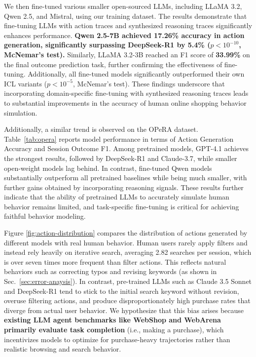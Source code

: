 \documentclass{article} %
\begin{document}
We then fine-tuned various smaller open-sourced LLMs, including LLaMA 3.2, Qwen 2.5, and Mistral, using our training dataset. The results demonstrate that fine-tuning LLMs with action traces and synthesized reasoning traces significantly enhances performance. \textbf{Qwen 2.5-7B achieved \textbf{17.26\%} accuracy in action generation, significantly surpassing DeepSeek-R1 by \textbf{5.4\%} {($p < 10^{-10}$, McNemar's test)}.} Similarly, LLaMA 3.2-3B reached an F1 score of \textbf{33.99\%} on the final outcome prediction task, further confirming the effectiveness of fine-tuning.
Additionally, all fine-tuned models significantly outperformed their own ICL variants ($p < 10^{-5}$, McNemar's test).
These findings underscore that incorporating domain-specific fine-tuning with synthesized reasoning traces leads to substantial improvements in the accuracy of human online shopping behavior simulation.

Additionally, a similar trend is observed on the OPeRA dataset. Table~\ref{tab:opera} reports model performance in terms of Action Generation Accuracy and Session Outcome F1. Among pretrained models, GPT-4.1 achieves the strongest results, followed by DeepSeek-R1 and Claude-3.7, while smaller open-weight models lag behind. In contrast, fine-tuned Qwen models substantially outperform all pretrained baselines while being much smaller, with further gains obtained by incorporating reasoning signals. 
These results further indicate that the ability of pretrained LLMs to accurately simulate human behavior remains limited, and task-specific fine-tuning is critical for achieving faithful behavior modeling.

Figure \ref{fig:action-distribution} compares the distribution of actions generated by different models with real human behavior. Human users rarely apply filters and instead rely heavily on iterative search, averaging 2.82 searches per session, which is over seven times more frequent than filter actions. This reflects natural behaviors such as correcting typos and revising keywords (as shown in Sec.~\ref{sec:error-anaysis}). In contrast, pre-trained LLMs such as Claude 3.5 Sonnet and DeepSeek-R1 tend to stick to the initial search keyword without revision, overuse filtering actions, and produce disproportionately high purchase rates that diverge from actual user behavior. 
We hypothesize that this bias arises because \textbf{existing LLM agent benchmarks like WebShop\cite{yaoWebShopScalableRealWorld2022} and WebArena\cite{zhouWebArenaRealisticWeb2024} primarily evaluate task completion} (i.e., making a purchase), which incentivizes models to optimize for purchase-heavy trajectories rather than realistic browsing and search behavior.
\end{document}
